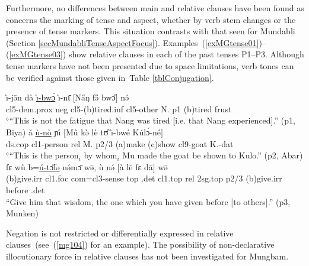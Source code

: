 \documentclass[10pt,twoside]{article}
\makeatletter
\newcommand{\cl}[1]{{\sc cl#1}}
\newcommand{\pref}[1]{(\ref{#1})}
\newcommand{\rref}[2]{\pref{#1}--\pref{#2}}
\newcommand{\sref}[1]{Section \ref{#1}}
\newcommand{\tref}[1]{Table \ref{#1}}
\def\elicited{$^\diamond$}
\def\ML#1{#1\symbol{"1DC6}} %
\renewcommand{\i}{ı}
\def\@{ə}
\def\eh{ɛ}
\def\oo{ʊ}
\def\aw{ɔ}
\def\ih{ɩ}
\def\ng{ŋ}
\def\ny{ɲ}
\makeatother
\begin{document}
Furthermore, no differences between
main and relative clauses have been found as concerns the
marking of tense and aspect,
whether by verb stem changes or the presence of tense markers.
This situation contrasts with that seen for Mundabli (\sref{secMundabliTenseAspectFocus}).
Examples~\rref{exMGtense01}{exMGtense03} show relative
clauses in each of the past tenses P1--P3. Although
tense markers have not been presented due to space
limitations, verb tones
can be verified against those given in~\tref{tblConjugation}.
%
\begin{exe}
\ex	\label{exMGtense01}
\gll \`\i-j\={\@}n d\`a \uline{\`\i-bw\'{\aw}} \`\i-n\={\ih} $[$N\H{a}{\ng} f\H{\@} bw\H{\aw}$]$ n\'{\@}	\\
\cl5-{\sc dem.prox} {\sc neg} \cl5-({\sc b})tired.{\sc inf} \cl5-other N. {\sc p1} ({\sc b})tired {\sc frust}	\\
\glt \elicited``This is not the fatigue that Nang was tired [i.e. that Nang experienced].''  ({\sc p1}, Biya) %
%
\ex	\label{exMGtense02}
\gll \v{a} \uline{\`u-n\`o} \ny\'{\i} $[$M\^{u} k\`{\@} l\`e t\^{\oo} \`\i-bw\'{e} K\'ul\'{\aw}-n\'e$]$	\\
{\sc ds.cop} \cl1-person {\sc rel} M. {\sc p2/3}{\footnotemark} ({\sc a})make ({\sc c})show \cl9-goat K.-{\sc dat}	\\
\glt \elicited``This is the person$_i$ by whom$_i$ Mu made the goat be shown to Kulo.'' ({\sc p2}, Abar)	%
\ex	\label{exMGtense03}
\gll f\ML{\eh} w\`u b=\uline{\'u-t\H{\aw}f{\@}} n\'{\@}m\={\aw} w\={\@}, \`u n\'{\@} $[$\`a l\=e f\ML{\eh} d\=a$]$ w\={\@} \\
({\sc b})give.{\sc irr} \cl1.{\sc foc} {\sc com=}\cl3-sense {\sc top} {\sc \cl3.det} \cl1.{\sc top} {\sc rel} {\sc 2sg.top}
{\sc p2/3} ({\sc b})give.{\sc irr} before {\sc \cl3.det}	\\ %
\glt ``Give him that wisdom, the one which you have given before [to others].'' ({\sc p3}, Munken) 
\end{exe}
%
%
Negation is not restricted or differentially expressed in relative clauses~(see~\pref{mg104} for an example).
The possibility of non-declarative illocutionary force in relative clauses has not been investigated
for Mungbam.
\end{document}
